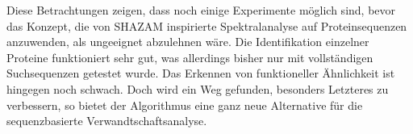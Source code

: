         Diese Betrachtungen zeigen, dass noch einige Experimente möglich sind, bevor das Konzept, die von SHAZAM inspirierte Spektralanalyse auf  Proteinsequenzen anzuwenden, als ungeeignet abzulehnen wäre. Die Identifikation einzelner Proteine funktioniert sehr gut, was allerdings bisher nur mit vollständigen Suchsequenzen getestet wurde. Das Erkennen von funktioneller Ähnlichkeit ist hingegen noch schwach. Doch wird ein Weg gefunden, besonders Letzteres zu verbessern, so bietet der Algorithmus eine ganz neue Alternative für die sequenzbasierte Verwandtschaftsanalyse.
